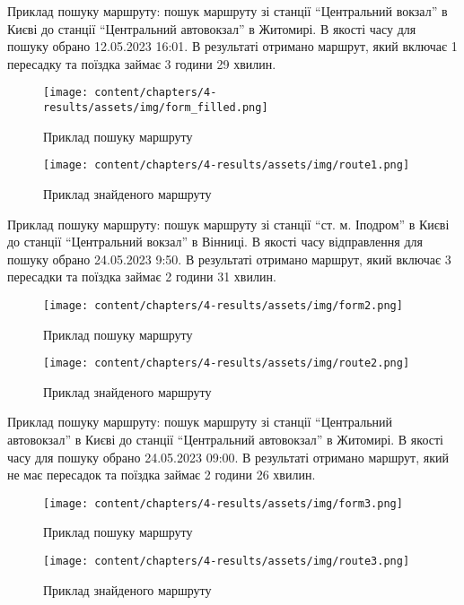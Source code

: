Приклад пошуку маршруту: пошук маршруту зі станції ``Центральний вокзал'' в Києві до станції ``Центральний автовокзал'' в Житомирі. В якості часу для пошуку обрано 12.05.2023 16:01. В результаті отримано маршрут, який включає 1 пересадку та поїздка займає 3 години 29 хвилин.

\begin{figure}[!htp]
	\centering
	\texttt{[image: content/chapters/4-results/assets/img/form\_filled.png]}
	\caption{Приклад пошуку маршруту}
	\label{fig:form1}
\end{figure}

\begin{figure}[!htp]
	\centering
	\texttt{[image: content/chapters/4-results/assets/img/route1.png]}
	\caption{Приклад знайденого маршруту}
	\label{fig:route1}
\end{figure}

\newpage

Приклад пошуку маршруту: пошук маршруту зі станції ``ст. м. Іподром'' в Києві до станції ``Центральний вокзал'' в Вінниці. В якості часу відправлення для пошуку обрано 24.05.2023 9:50. В результаті отримано маршрут, який включає 3 пересадки та поїздка займає 2 години 31 хвилин.

\begin{figure}[!htp]
	\centering
	\texttt{[image: content/chapters/4-results/assets/img/form2.png]}
	\caption{Приклад пошуку маршруту}
	\label{fig:form2}
\end{figure}

\begin{figure}[!htp]
	\centering
	\texttt{[image: content/chapters/4-results/assets/img/route2.png]}
	\caption{Приклад знайденого маршруту}
	\label{fig:route2}
\end{figure}

\newpage

Приклад пошуку маршруту: пошук маршруту зі станції ``Центральний автовокзал'' в Києві до станції ``Центральний автовокзал'' в Житомирі. В якості часу для пошуку обрано 24.05.2023 09:00. В результаті отримано маршрут, який не має пересадок та поїздка займає 2 години 26 хвилин.

\begin{figure}[!htp]
	\centering
	\texttt{[image: content/chapters/4-results/assets/img/form3.png]}
	\caption{Приклад пошуку маршруту}
	\label{fig:form3}
\end{figure}

\begin{figure}[!htp]
	\centering
	\texttt{[image: content/chapters/4-results/assets/img/route3.png]}
	\caption{Приклад знайденого маршруту}
	\label{fig:route3}
\end{figure}




